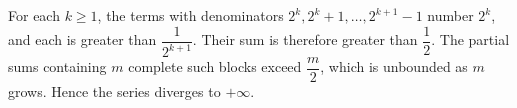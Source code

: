 For each $k\ge1$, the terms with denominators $2^k,2^k+1,\ldots,2^{k+1}-1$ number $2^k$, and each is greater than $\dfrac{1}{2^{k+1}}$. Their sum is therefore greater than $\dfrac{1}{2}$. The partial sums containing $m$ complete such blocks exceed $\dfrac{m}{2}$, which is unbounded as $m$ grows. Hence the series diverges to $+\infty$.
